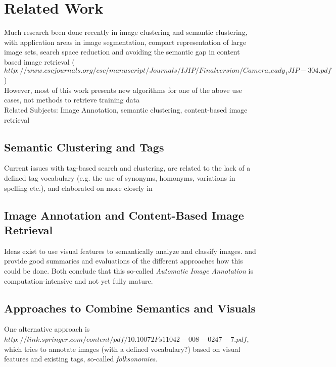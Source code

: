 \section{Related Work}
\label{sec_relatedwork}

Much research been done recently in image clustering and semantic clustering, with application areas in image segmentation, compact representation of large image sets, search space reduction and avoiding the semantic gap in content based image retrieval ($http://www.cscjournals.org/csc/manuscript/Journals/IJIP/Finalversion/Camera_ready_IJIP-304.pdf$) \\
However, most of this work presents new algorithms for one of the above use cases, not methods to retrieve training data \\

Related Subjects: Image Annotation, semantic clustering, content-based image retrieval

\subsection{Semantic Clustering and Tags}
Current issues with tag-based search and clustering, are related to the lack of a defined tag vocabulary (e.g. the use of synonyms, homonyms, variations in spelling etc.), and elaborated on more closely in \cite{Auer2011}

\subsection{Image Annotation and Content-Based Image Retrieval}

Ideas exist to use visual features to semantically analyze and classify images. \cite{Liu2007} and \cite{Zhang2012} provide good summaries and evaluations of the different approaches how this could be done. Both conclude that this so-called \emph{Automatic Image Annotation}  is computation-intensive and not yet fully mature.

\subsection{Approaches to Combine Semantics and Visuals}

One alternative approach is $http://link.springer.com/content/pdf/10.1007 2Fs11042-008-0247-7.pdf$, which tries to annotate images (with a defined vocabulary?) based on visual features and existing tags, so-called \emph{folksonomies}.